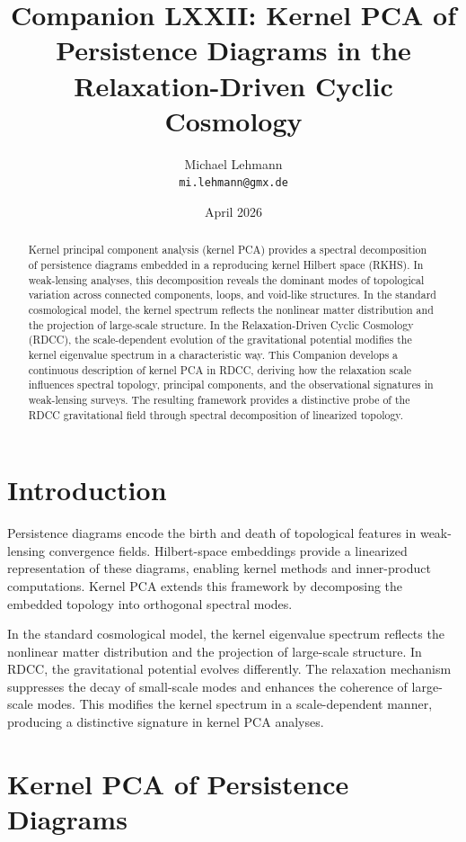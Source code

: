 \documentclass[11pt,a4paper]{article}
\title{\textbf{Companion LXXII: Kernel PCA of Persistence Diagrams in the Relaxation-Driven Cyclic Cosmology}}
\author{Michael Lehmann \\ \texttt{mi.lehmann@gmx.de}}
\date{April 2026}
\begin{document}
\maketitle

\begin{abstract}
Kernel principal component analysis (kernel PCA) provides a spectral decomposition 
of persistence diagrams embedded in a reproducing kernel Hilbert space (RKHS). In 
weak-lensing analyses, this decomposition reveals the dominant modes of 
topological variation across connected components, loops, and void-like structures. 
In the standard cosmological model, the kernel spectrum reflects the nonlinear 
matter distribution and the projection of large-scale structure. In the 
Relaxation-Driven Cyclic Cosmology (RDCC), the scale-dependent evolution of the 
gravitational potential modifies the kernel eigenvalue spectrum in a characteristic 
way. This Companion develops a continuous description of kernel PCA in RDCC, 
deriving how the relaxation scale influences spectral topology, principal 
components, and the observational signatures in weak-lensing surveys. The 
resulting framework provides a distinctive probe of the RDCC gravitational field 
through spectral decomposition of linearized topology.
\end{abstract}
\section{Introduction}

Persistence diagrams encode the birth and death of topological features in 
weak-lensing convergence fields. Hilbert-space embeddings provide a linearized 
representation of these diagrams, enabling kernel methods and inner-product 
computations. Kernel PCA extends this framework by decomposing the embedded 
topology into orthogonal spectral modes.

In the standard cosmological model, the kernel eigenvalue spectrum reflects the 
nonlinear matter distribution and the projection of large-scale structure. In 
RDCC, the gravitational potential evolves differently. The relaxation mechanism 
suppresses the decay of small-scale modes and enhances the coherence of large-scale 
modes. This modifies the kernel spectrum in a scale-dependent manner, producing a 
distinctive signature in kernel PCA analyses.
\section{Kernel PCA of Persistence Diagrams}
\end{document}
